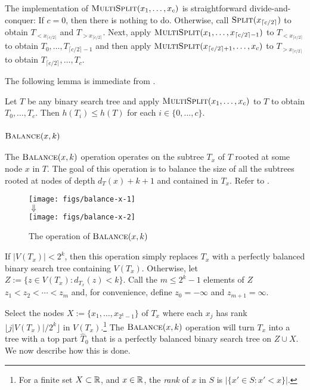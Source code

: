 \documentclass[kpfonts]{patmorin}
\let\le\leqslant
\begin{document}
The implementation of $\textsc{MultiSplit}(x_1,\ldots,x_c)$ is straightforward divide-and-conquer:  If $c=0$, then there is nothing to do.  Otherwise, call $\textsc{Split}(x_{\lceil c/2\rceil})$ to obtain $T_{<x_{\lceil c/2\rceil}}$ and $T_{>x_{\lceil c/2\rceil}}$.  Next, apply $\textsc{MultiSplit}(x_1,\ldots,x_{\lceil c/2\rceil-1})$ to $T_{<x_{\lceil c/2\rceil}}$ to obtain $T_0,\ldots,T_{\lceil c/2\rceil-1}$ and then apply $\textsc{MultiSplit}(x_{\lceil c/2\rceil+1},\ldots,x_c)$ to $T_{>x_{\lceil c/2\rceil}}$ to obtain $T_{\lceil c/2\rceil},\ldots,T_c$.

The following lemma is immediate from .
\begin{lem}
  Let $T$ be any binary search tree and apply $\textsc{MultiSplit}(x_1,\ldots,x_c)$ to $T$ to obtain $T_0,\ldots,T_c$.  Then $h(T_i)\le h(T)$ for each $i\in\{0,\ldots,c\}$.
\end{lem}

\subsubsection{$\textsc{Balance}(x,k)$}

The $\textsc{Balance}(x,k)$ operation operates on the subtree $T_x$ of $T$ rooted at some node $x$ in $T$.
The goal of this operation is to balance the size of all the subtrees rooted at nodes of depth $d_T(x)+k+1$ and contained in $T_x$.
Refer to .

\begin{figure}
    \begin{center}
      \texttt{[image: figs/balance-x-1]} \\[-2ex]
      $\Downarrow$ \\[1ex]
      \texttt{[image: figs/balance-x-2]}
    \end{center}
  \caption{The operation of $\textsc{Balance}(x,k)$}
\end{figure}

If $|V(T_x)|< 2^k$, then this operation simply replaces $T_x$ with a perfectly balanced binary search tree containing $V(T_x)$.  Otherwise, let $Z:=\{z\in V(T_x): d_{T_x}(z)< k\}$.  Call the $m\le 2^k-1$ elements of $Z$  $z_1<z_2<\cdots<z_{m}$ and, for convenience, define $z_0=-\infty$ and $z_{m+1}=\infty$.

Select the nodes $X:=\{x_1,\ldots,x_{2^k-1}\}$ of $T_x$ where each $x_j$ has rank $\lfloor j|V(T_x)|/2^k\rfloor$ in $V(T_x)$.\footnote{For a finite set $X\subset\mathbb{R}$, and $x\in\mathbb{R}$, the \emph{rank} of $x$ in $S$ is $|\{x'\in S: x'<x\}|$.}  The $\textsc{Balance}(x,k)$ operation will turn $T_x$ into a tree with a top part $\hat{T}_0$ that is a perfectly balanced binary search tree on $Z\cup X$.  We now describe how this is done.
\end{document}

